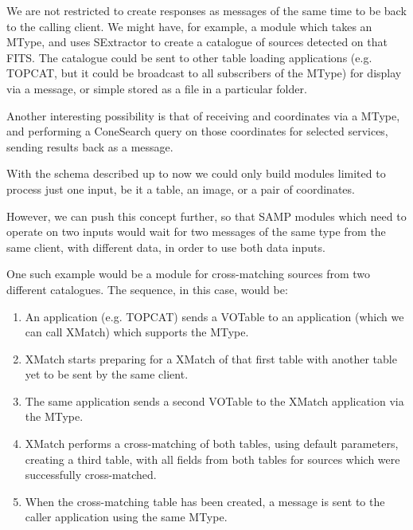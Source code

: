 			We are not restricted to create responses as messages
			of the same time to be back to the calling client. We
			might have, for example, a module which takes an
			 MType, and uses
			SExtractor
			to create a catalogue of sources detected on that FITS.
			The catalogue could be sent to other table loading
			applications (e.g. TOPCAT, but it could be broadcast to
			all subscribers of the  MType)
			for display via a  message,
			or simple stored as a file in a particular folder.
			
			Another interesting possibility is that of receiving
			 and  coordinates via a 
			 MType, and performing a
			ConeSearch query on those coordinates for selected
			services, sending results back as a
			 message.
			
			With the schema described up to now we could only build
			modules limited to process just one input, be it a
			table, an image, or a pair of coordinates. 
			
			However, we can push this concept further, so that SAMP
			modules which need to operate on two inputs would wait
			for two messages of the same type from the same client,
			with different data, in order to use both data inputs.
			
			One such example would be a module for cross-matching
			sources from two different catalogues. The sequence, in
			this case, would be:
			
			\begin{enumerate}
				\item An application (e.g. TOPCAT) sends a VOTable
				to an application (which we can call XMatch) which
				supports the  MType.
				
				\item XMatch starts preparing for a XMatch of that
				first table with another table yet to be sent by 
				the same client.
				
				\item The same application sends a second VOTable
				to the XMatch application via the
				 MType.
				
				\item XMatch performs a cross-matching of both
				tables, using default parameters, creating a third
				table, with all fields from both tables for
				sources which were successfully cross-matched.
				
				\item When the cross-matching table has been
				created, a message is sent to the caller
				application using the same
				 MType.
			\end{enumerate}
			
